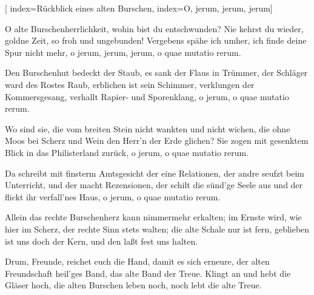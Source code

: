[
	index={Rückblick eines alten Burschen},
	index={O, jerum, jerum, jerum}]

\beginverse* 
O alte Burschenherrlichkeit,
wohin bist du entschwunden?
Nie kehrst du wieder, goldne Zeit,
so froh und ungebunden!
Vergebens spähe ich umher,
ich finde deine Spur nicht mehr,
o jerum, jerum, jerum, o quae mutatio rerum.
\endverse

\beginverse* 
Den Burschenhut bedeckt der Staub,
es sank der Flaus in Trümmer,
der Schläger ward des Rostes Raub,
erblichen ist sein Schimmer,
verklungen der Kommersgesang,
verhallt Rapier- und Sporenklang,
o jerum, o quae mutatio rerum.
\endverse

\beginverse* 
Wo sind sie, die vom breiten Stein
nicht wankten und nicht wichen,
die ohne Moos bei Scherz und Wein
den Herr'n der Erde glichen?
Sie zogen mit gesenktem Blick
in das Philisterland zurück,
o jerum, o quae mutatio rerum.
\endverse

\beginverse* 
Da schreibt mit finsterm Amtsgesicht
der eine Relationen,
der andre seufzt beim Unterricht,
und der macht Rezensionen,
der schilt die sünd'ge Seele aus
und der flickt ihr verfall'nes Haus,
o jerum, o quae mutatio rerum.
\endverse

\beginverse* 
Allein das rechte Burschenherz
kann nimmermehr erkalten;
im Ernste wird, wie hier im Scherz,
der rechte Sinn stets walten;
die alte Schale nur ist fern,
geblieben ist uns doch der Kern,
und den laßt fest uns halten.
\endverse

\beginverse*
Drum, Freunde, reichet euch die Hand,
damit es sich erneure,
der alten Freundschaft heil'ges Band,
das alte Band der Treue.
Klingt an und hebt die Gläser hoch,
die alten Burschen leben noch,
noch lebt die alte Treue.
\endverse
\endsong


